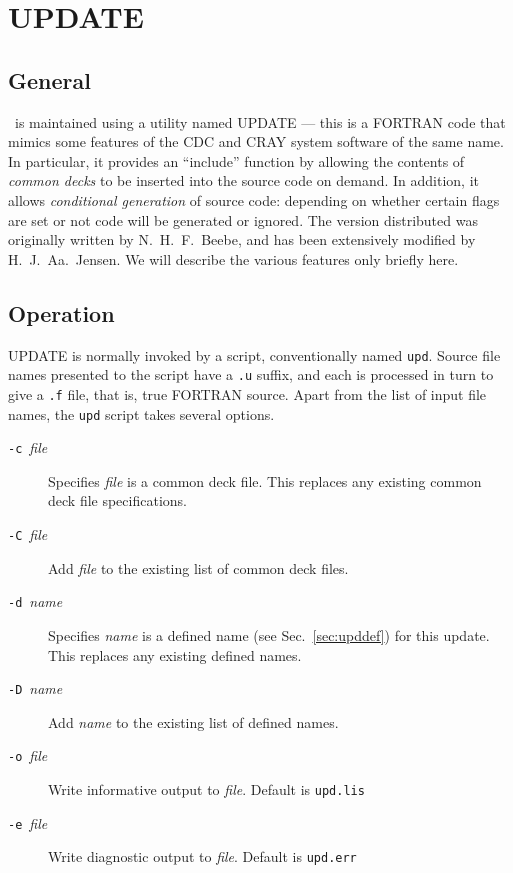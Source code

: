 \chapter{UPDATE}\label{ch:update}

\section{General}

\siraba\ is maintained using a utility named UPDATE --- this is a
FORTRAN code that mimics some features of the CDC and CRAY system
software of the same name.  In particular, it provides an
``include'' function by allowing the contents of {\em common
decks\/} to be inserted into the source code on demand.  In
addition, it allows {\em conditional generation\/} of source code:
depending on whether certain flags are set or not code will be
generated or ignored.  The version distributed was originally
written by N.~H.~F.~Beebe, and has been extensively modified by
H.~J.~Aa.~Jensen.  We will describe the various features only briefly
here.

\section{Operation}

UPDATE is normally invoked by a
script, conventionally named 
\verb|upd|.  Source file names presented to the script have a
\verb|.u| suffix, and each is processed in turn to give a
\verb|.f| file, that is, true FORTRAN source.  Apart from the list
of input file names, the \verb|upd| script takes several options.
\begin{description}
\item[\verb|-c|~{\em file\/}] Specifies {\em file\/} is a common
deck file.  This replaces any existing common deck file
specifications.
\item[\verb|-C|~{\em file\/}] Add {\em file\/} to the existing
list of common deck files.
\item[\verb|-d|~{\em name\/}] Specifies {\em name\/} is a defined
name (see Sec.~\ref{sec:upddef}) for this update.  This replaces
any existing defined names.
\item[\verb|-D|~{\em name\/}] Add {\em name\/} to the existing
list of defined names.
\item[\verb|-o|~{\em file\/}] Write informative output to {\em
file\/}.  Default is \verb|upd.lis|
\item[\verb|-e|~{\em file\/}] Write diagnostic output to {\em
file\/}.  Default is \verb|upd.err|
\end{description}

